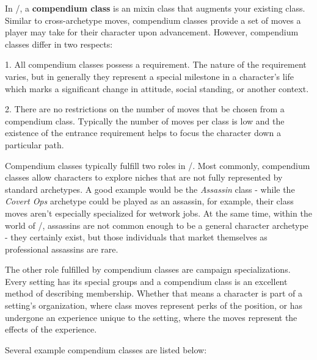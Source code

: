 \documentclass[oneside,10pt]{article}
\begin{document}
\begin{multicols}{2}

In \SW/, a \textbf{compendium class} is an mixin class that augments your existing class. Similar to cross-archetype moves, compendium classes provide a set of moves a player may take for their character upon advancement. However, compendium classes differ in two respects:

\begin{dent}

1. All compendium classes possess a requirement. The nature of the requirement varies, but in generally they represent a special milestone in a character's life which marks a significant change in attitude, social standing, or another context.

2. There are no restrictions on the number of moves that be chosen from a compendium class. Typically the number of moves per class is low and the existence of the entrance requirement helps to focus the character down a particular path.

\end{dent}

Compendium classes typically fulfill two roles in \SW/. Most commonly, compendium classes allow characters to explore niches that are not fully represented by standard archetypes. A good example would be the \textit{Assassin} class - while the \textit{Covert Ops} archetype could be played as an assassin, for example, their class moves aren't especially specialized for wetwork jobs. At the same time, within the world of \SW/, assassins are not common enough to be a general character archetype -  they certainly exist, but those individuals that market themselves as professional assassins are rare.

The other role fulfilled by compendium classes are campaign specializations. Every setting has its special groups and a compendium class is an excellent method of describing membership. Whether that means a character is part of a setting's organization, where class moves represent perks of the position, or has undergone an experience unique to the setting, where the moves represent the effects of the experience.

Several example compendium classes are listed below:

\end{multicols}

\newpage

\end{document}
